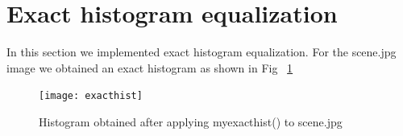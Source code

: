 \documentclass[paper=a4, fontsize=11pt]{scrartcl} %
\numberwithin{equation}{section} %
\numberwithin{figure}{section} %
\numberwithin{table}{section} %
\begin{document}
\section{Exact histogram equalization}
    
In this section we implemented exact histogram equalization. For the scene.jpg image we obtained an exact histogram as shown in Fig ~\ref{fig:figexacthist} 
        \begin{figure}[h!]
            \centering
            \texttt{[image: exacthist]}
            \caption{Histogram obtained after applying myexacthist() to scene.jpg}
            \label{fig:figexacthist}
        \end{figure}
\end{document}
